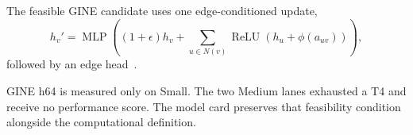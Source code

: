 The feasible GINE candidate uses one edge-conditioned update,
\begin{equation}
 h_v'=\operatorname{MLP}\!\left((1+\epsilon)h_v+
 \sum_{u\in N(v)}\operatorname{ReLU}(h_u+\phi(a_{uv}))\right),
\end{equation}
followed by an edge head~\cite{hu2020pretraining}.



GINE h64 is measured only on Small. The two Medium lanes exhausted a T4 and receive no performance score. The model card preserves that feasibility condition alongside the computational definition.
